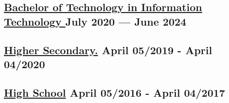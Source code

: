 



\subsection{{\href{https://www.knmiet.edu/}{Bachelor of Technology in Information Technology } \hfill July 2020 --- June 2024}}
\vspace{0.25em}
\subtext{}\textbf{} 
\vspace{0.2em}
\begin{null}
\end{null}

\subsection{{\href{}{Higher Secondary.} \hfill April 05/2019 - April 04/2020}}
\begin{null}

\end{null}
\vspace{0.25em}
\subsection{{\href{}{High School} \hfill April 05/2016 - April 04/2017}}
\begin{null}

\end{null}